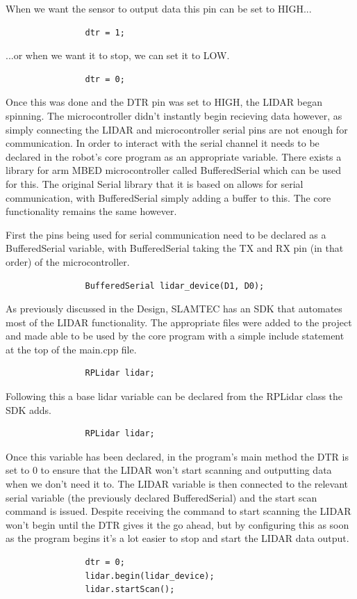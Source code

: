 				When we want the sensor to output data this pin can be set to HIGH...
				\begin{lstlisting}
				dtr = 1;
				\end{lstlisting}
				
				...or when we want it to stop, we can set it to LOW.
				\begin{lstlisting}
				dtr = 0;
				\end{lstlisting}
				
				Once this was done and the DTR pin was set to HIGH, the LIDAR began spinning. The microcontroller didn't instantly begin recieving data however, as simply connecting the LIDAR and microcontroller serial pins are not enough for communication. In order to interact with the serial channel it needs to be declared in the robot's core program as an appropriate variable. There exists a library for arm MBED microcontroller called BufferedSerial which can be used for this. The original Serial library that it is based on allows for serial communication, with BufferedSerial simply adding a buffer to this. The core functionality remains the same however.
				
				First the pins being used for serial communication need to be declared as a BufferedSerial variable, with BufferedSerial taking the TX and RX pin (in that order) of the microcontroller. 
				\begin{lstlisting}
				BufferedSerial lidar_device(D1, D0);
				\end{lstlisting}
				
				As previously discussed in the Design, SLAMTEC has an SDK that automates most of the LIDAR functionality. The appropriate files were added to the project and made able to be used by the core program with a simple include statement at the top of the main.cpp file.
				\begin{lstlisting}
				RPLidar lidar;
				\end{lstlisting}
				
				Following this a base lidar variable can be declared from the RPLidar class the SDK adds.
				\begin{lstlisting}
				RPLidar lidar;
				\end{lstlisting}
				
				Once this variable has been declared, in the program's main method the DTR is set to 0 to ensure that the LIDAR won't start scanning and outputting data when we don't need it to. The LIDAR variable is then connected to the relevant serial variable (the previously declared BufferedSerial) and the start scan command is issued. Despite receiving the command to start scanning the LIDAR won't begin until the DTR gives it the go ahead, but by configuring this as soon as the program begins it's a lot easier to stop and start the LIDAR data output.
				\begin{lstlisting}
				dtr = 0;
				lidar.begin(lidar_device);
				lidar.startScan();
				\end{lstlisting}
				
